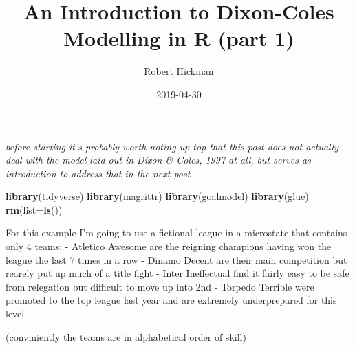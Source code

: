 \documentclass[]{article}
\title{An Introduction to Dixon-Coles Modelling in R (part 1)}
\author{Robert Hickman}
\date{2019-04-30}
\newenvironment{Shaded}{\begin{snugshade}}{\end{snugshade}}
\newcommand{\KeywordTok}[1]{\textcolor[rgb]{0.13,0.29,0.53}{\textbf{#1}}}
\newcommand{\DataTypeTok}[1]{\textcolor[rgb]{0.13,0.29,0.53}{#1}}
\newcommand{\NormalTok}[1]{#1}
\begin{document}
\maketitle

\emph{\emph{before starting it's probably worth noting up top that this
post does not actually deal with the model laid out in Dixon \& Coles,
1997 at all, but serves as introduction to address that in the next
post}}

\begin{Shaded}
\begin{Highlighting}[]
\KeywordTok{library}\NormalTok{(tidyverse)}
\KeywordTok{library}\NormalTok{(magrittr)}
\KeywordTok{library}\NormalTok{(goalmodel)}
\KeywordTok{library}\NormalTok{(glue)}
\KeywordTok{rm}\NormalTok{(}\DataTypeTok{list=}\KeywordTok{ls}\NormalTok{())}
\end{Highlighting}
\end{Shaded}

For this example I'm going to use a fictional league in a microstate
that contains only 4 teams: - Atletico Awesome are the reigning
champions having won the league the last 7 times in a row - Dinamo
Decent are their main competition but rearely put up much of a title
fight - Inter Ineffectual find it fairly easy to be safe from relegation
but difficult to move up into 2nd - Torpedo Terrible were promoted to
the top league last year and are extremely underprepared for this level

(conviniently the teams are in alphabetical order of skill)
\end{document}
